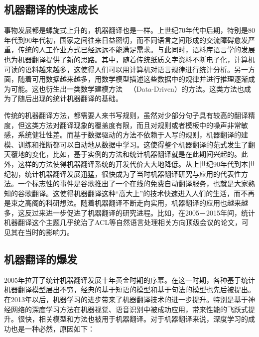 
\subsection{机器翻译的快速成长}

\parinterval 事物发展都是螺旋式上升的，机器翻译也是一样。上世纪70年代中后期，特别是80年代到90年代初，国家之间往来日益密切，而不同语言之间形成的交流障碍愈发严重，传统的人工作业方式已经远远不能满足需求。与此同时，语料库语言学的发展也为机器翻译提供了新的思路。其中，随着传统纸质文字资料不断电子化，计算机可读的语料越来越多，这使得人们可以用计算机对语言规律进行统计分析。另一方面，随着可用数据越来越多，用数学模型描述这些数据中的规律并进行推理逐渐成为可能。这也衍生出一类数学建模方法\ \dash\ {\small{}}（Data-Driven）的方法。这类方法也成为了随后出现的统计机器翻译的基础。

传统的机器翻译方法，都需要人来书写规则，虽然对少部分句子具有较高的翻译精度，但这类方法对翻译现象的覆盖度有限，而且对规则或者模板中的噪声非常敏感，系统健壮性差。而基于数据驱动的方法不依赖于人写的规则，机器翻译的建模、训练和推断都可以自动地从数据中学习。这使得整个机器翻译的范式发生了翻天覆地的变化，比如，基于实例的方法和统计机器翻译就是在此期间兴起的。此外，这样的方法使得机器翻译系统的开发代价大大地降低。从上世纪90年代到本世纪初，统计机器翻译发展迅猛，很快成为了当时机器翻译研究与应用的代表性方法。一个标志性的事件是谷歌推出了一个在线的免费自动翻译服务，也就是大家熟知的谷歌翻译。这使得机器翻译这种``高大上''的技术快速进入人们的生活，而不再是束之高阁的科研想法。随着机器翻译不断走向实用，机器翻译的应用也越来越多，这反过来进一步促进了机器翻译的研究进程。比如，在2005－2015年间，统计机器翻译这个主题几乎统治了ACL等自然语言处理相关方向顶级会议的论文，可见其在当时的影响力。


\subsection{机器翻译的爆发}

\parinterval 2005年拉开了统计机器翻译发展十年黄金时期的序幕。在这一时期，各种基于统计机器翻译模型层出不穷，经典的基于短语的模型和基于句法的模型也先后被提出。在2013年以后，机器学习的进步带来了机器翻译技术的进一步提升。特别是基于神经网络的深度学习方法在机器视觉、语音识别中被成功应用，带来性能的飞跃式提升。很快，相关模型和方法也被用于机器翻译。对于机器翻译来说，深度学习的成功也是一种必然，原因如下：

